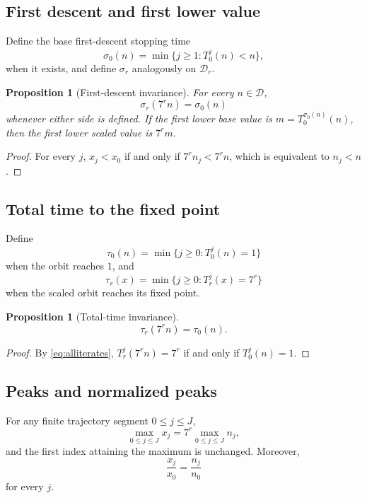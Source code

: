 \documentclass[11pt]{article}
\newtheorem{proposition}[theorem]{Proposition}
\begin{document}
\subsection{First descent and first lower value}
Define the base first-descent stopping time
\begin{equation}
\sigma_0(n)=\min\{j\ge1:T_0^j(n)<n\},
\label{eq:sigma0}
\end{equation}
when it exists, and define $\sigma_r$ analogously on $\mathcal D_r$.

\begin{proposition}[First-descent invariance]
For every $n\in\mathcal D$,
\begin{equation}
\sigma_r(7^rn)=\sigma_0(n)
\label{eq:sigmainv}
\end{equation}
whenever either side is defined. If the first lower base value is $m=T_0^{\sigma_0(n)}(n)$, then the first lower scaled value is $7^rm$.
\end{proposition}
\begin{proof}
For every $j$, $x_j<x_0$ if and only if $7^rn_j<7^rn$, which is equivalent to $n_j<n$.
\end{proof}

\subsection{Total time to the fixed point}
Define
\[
\tau_0(n)=\min\{j\ge0:T_0^j(n)=1\}
\]
when the orbit reaches $1$, and
\[
\tau_r(x)=\min\{j\ge0:T_r^j(x)=7^r\}
\]
when the scaled orbit reaches its fixed point.

\begin{proposition}[Total-time invariance]
\begin{equation}
\tau_r(7^rn)=\tau_0(n).
\label{eq:tauinv}
\end{equation}
\end{proposition}
\begin{proof}
By \eqref{eq:alliterates}, $T_r^j(7^rn)=7^r$ if and only if $T_0^j(n)=1$.
\end{proof}

\subsection{Peaks and normalized peaks}
For any finite trajectory segment $0\le j\le J$,
\begin{equation}
\max_{0\le j\le J}x_j=7^r\max_{0\le j\le J}n_j,
\label{eq:peakscale}
\end{equation}
and the first index attaining the maximum is unchanged. Moreover,
\begin{equation}
\frac{x_j}{x_0}=\frac{n_j}{n_0}
\label{eq:normalizedratio}
\end{equation}
for every $j$.
\end{document}
